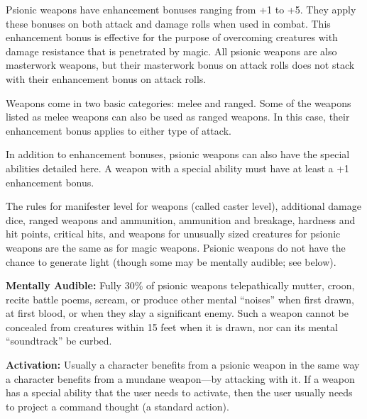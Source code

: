 \documentclass{article}
\begin{document}
Psionic weapons have enhancement bonuses ranging from +1 to +5. They apply these 
bonuses on both attack and damage rolls when used in combat. This enhancement bonus 
is effective for the purpose of overcoming creatures with damage resistance that 
is penetrated by magic. All psionic weapons are also masterwork weapons, but their 
masterwork bonus on attack rolls does not stack with their enhancement bonus on 
attack rolls.

Weapons come in two basic categories: melee and ranged. Some of the weapons listed 
as melee weapons can also be used as ranged weapons. In this case, their enhancement 
bonus applies to either type of attack. 

In addition to enhancement bonuses, psionic weapons can also have the special abilities 
detailed here. A weapon with a special ability must have at least a +1 enhancement 
bonus.

The rules for manifester level for weapons (called caster level), additional damage 
dice, ranged weapons and ammunition, ammunition and breakage, hardness and hit 
points, critical hits, and weapons for unusually sized creatures for psionic weapons 
are the same as for magic weapons\textit{. }Psionic weapons do not have the chance 
to generate light (though some may be mentally audible; see below).

\textbf{Mentally Audible:} Fully 30\% of psionic weapons telepathically mutter, 
croon, recite battle poems, scream, or produce other mental ``noises'' when first 
drawn, at first blood, or when they slay a significant enemy. Such a weapon cannot 
be concealed from creatures within 15 feet when it is drawn, nor can its mental 
``soundtrack'' be curbed.

\textbf{Activation:} Usually a character benefits from a psionic weapon in the 
same way a character benefits from a mundane weapon---by attacking with it. If 
a weapon has a special ability that the user needs to activate, then the user usually 
needs to project a command thought (a standard action).
\end{document}
